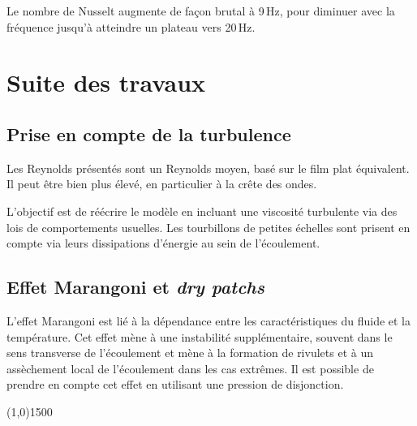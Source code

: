 \documentclass[a0,portrait]{a0poster}
\begin{document}
\begin{multicols}{2}
\begin{multicols}{2}
        Le nombre de Nusselt augmente de façon brutal à 9\,Hz, pour diminuer avec la fréquence jusqu'à atteindre un plateau vers 20\,Hz.
    \end{multicols}

    \section*{Suite des travaux}

    \begin{multicols}{2}
        \subsection*{Prise en compte de la turbulence}
        Les Reynolds présentés sont un Reynolds moyen, basé sur le film plat équivalent. Il peut être bien plus élevé, en particulier à la crête des ondes.

        L'objectif est de réécrire le modèle en incluant une viscosité turbulente via des lois de comportements usuelles. Les tourbillons de petites échelles sont prisent en compte via leurs dissipations d'énergie au sein de l'écoulement.
        \columnbreak

        \subsection*{Effet Marangoni et \emph{dry patchs}}
        L'effet Marangoni est lié à la dépendance entre les caractéristiques du fluide et la température.
        Cet effet mène à une instabilité supplémentaire, souvent dans le sens transverse de l'écoulement et mène à la formation de rivulets et à un assèchement local de l'écoulement dans les cas extrêmes. Il est possible de prendre en compte cet effet en utilisant une pression de disjonction.

    \end{multicols}

\end{multicols}

\begin{center}
    \line(1,0){1500}
\end{center}
\end{document}

